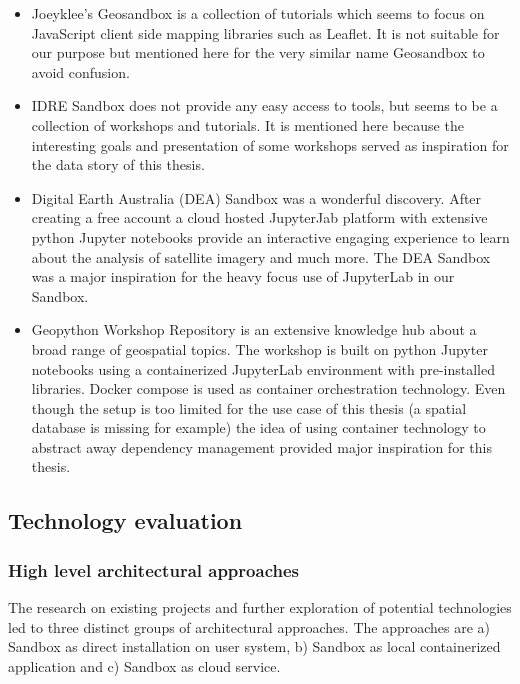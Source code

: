 \documentclass[11pt, a4paper, oneside, parskip=full-]{scrartcl}
\begin{document}
\begin{itemize}
  \item Joeyklee's Geosandbox\cite{project-joeyklee} is a collection of
  tutorials which seems to focus on JavaScript client side mapping libraries
  such as Leaflet. It is not suitable for our purpose but mentioned here for the
  very similar name Geosandbox to avoid confusion.
  \item IDRE Sandbox\cite{project-idre} does not provide any easy access to
  tools, but seems to be a collection of workshops and tutorials. It is
  mentioned here because the interesting goals and presentation of some
  workshops served as inspiration for the data story of this thesis.
  \item Digital Earth Australia (DEA) Sandbox\cite{project-dea} was a wonderful
  discovery. After creating a free account a cloud hosted JupyterJab platform
  with extensive python Jupyter notebooks provide an interactive engaging
  experience to learn about the analysis of satellite imagery and much more. The
  DEA Sandbox was a major inspiration for the heavy focus use of
  JupyterLab\cite{jupyterlab} in our Sandbox.
  \item Geopython Workshop Repository\cite{project-geopython} is an extensive
  knowledge hub about a broad range of geospatial topics. The workshop is built
  on python Jupyter notebooks using a containerized JupyterLab environment with
  pre-installed libraries. Docker compose is used as container orchestration
  technology. Even though the setup is too limited for the use case of this
  thesis (a spatial database is missing for example) the idea of using container
  technology to abstract away dependency management provided major inspiration
  for this thesis.
\end{itemize}

\subsection{Technology evaluation}

\subsubsection{High level architectural approaches}
The research on existing projects and further exploration of potential
technologies led to three distinct groups of architectural approaches. The
approaches are a) Sandbox as direct installation on user system, b) Sandbox as
local containerized application and c) Sandbox as cloud service.
\end{document}
